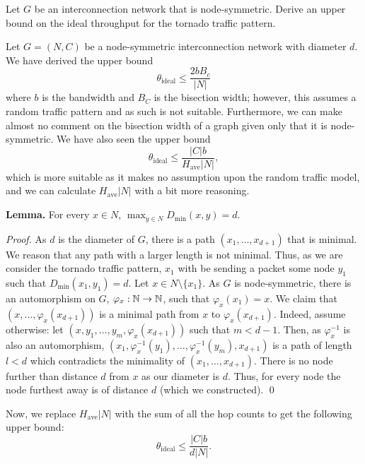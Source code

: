   \question Let $G$ be an interconnection network that is node-symmetric. Derive an upper bound on the ideal throughput for the tornado traffic pattern.
  \begin{solution}
    Let $G = (N,C)$ be a node-symmetric interconnection network with diameter $d$. We have derived the upper bound 
    \[ \theta_{\text{ideal}} \leq \frac{2bB_c}{\lvert N \rvert}\] 
    where $b$ is the bandwidth and $B_C$ is the bisection width; however, this assumes a random traffic pattern and as such is not suitable. Furthermore, we can make almost no comment on the bisection width of a graph given only that it is node-symmetric. We have also seen the upper bound
    \[ \theta_{\text{ideal}} \leq \frac{\lvert C \rvert b}{H_\text{ave} \lvert N \rvert}, \]
    which is more suitable as it makes no assumption upon the random traffic model, and we can calculate $H_\text{ave} \lvert N \rvert$ with a bit more reasoning. 

    \textbf{Lemma.} For every $x \in N$, $\max_{y \in N} D_\text{min}(x,y) = d$.

    \emph{Proof.} As $d$ is the diameter of $G$, there is a path $(x_1, \ldots, x_{d+1})$ that is minimal. We reason that any path with a larger length is not minimal. Thus, as we are consider the tornado traffic pattern, $x_1$ with be sending a packet some node $y_1$ such that $D_\text{min}(x_1, y_1) = d$. Let $x \in N \setminus \{x_1\}$. As $G$ is node-symmetric, there is an automorphism on $G$, $\varphi_x: \mathbb{N} \to \mathbb{N}$, such that $\varphi_x(x_1) = x$. We claim that $(x, \ldots, \varphi_x(x_{d+1}))$ is a minimal path from $x$ to $\varphi_x(x_{d+1})$. Indeed, assume otherwise: let $(x, y_1, \ldots, y_m, \varphi_x(x_{d+1}))$ such that $m < d-1$. Then, as $\varphi^{-1}_x$ is also an automorphism, $(x_1, \varphi^{-1}_x(y_1), \ldots, \varphi^{-1}_x(y_m), x_{d+1})$ is a path of length $l < d$ which contradicts the minimality of $(x_1, \ldots, x_{d+1})$. There is no node further than distance $d$ from $x$ as our diameter is $d$. Thus, for every node the node furthest away is of distance $d$ (which we constructed). \qed

    Now, we replace $H_\text{ave} \lvert N \rvert$ with the sum of all the hop counts to get the following upper bound:
    \[ \theta_\text{ideal} \leq \frac{\lvert C \rvert b}{d \lvert N \rvert}. \]
  \end{solution}

